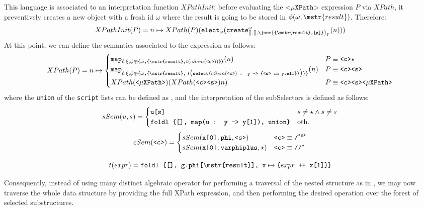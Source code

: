 \begin{definition}
This language is associated to an interpretation function $XPathInit$; before evaluating the $\texttt{<}\mu\texttt{XPath}\texttt{>}$  expression $P$ via $XPath$, it preventively creates a new object with a fresh id $\omega$ where the result is going to be stored in $\phi(\omega,\mstr{result})$. Therefore:
\[XPathInit(P) = n\mapsto XPath(P) (\texttt{elect}_\omega(\texttt{create}^\omega_{[],[],\jsem{\texttt{\{\mstr{result},[g]\}}}_\Gamma}(n)))\]
At this point, we can define the semantics associated to the expression as follows:
\[XPath(P) = n\mapsto \begin{cases}
	\texttt{map}_{\ell,\xi,\phi\oplus \texttt{\{}\omega\texttt{,\{\mstr{result},}t(cSem(\texttt{<c>}))\texttt{\}\}} }(n) & P\equiv \texttt{<c>}\star\\
	\texttt{map}_{\ell,\xi,\phi\oplus\texttt{\{}\omega\texttt{,\{\mstr{result},}\;t\big(\texttt{select(} cSem(\texttt{<c>}) \texttt{ : y -> \{<s> in y.\textbf{ell}\})}\big)\texttt{\}}\}}(n) & P\equiv \texttt{<c>}\texttt{<s>}\\
	XPath(\texttt{<}\mu\texttt{XPath>}) (XPath(\texttt{<c><s>}) n ) & P\equiv \texttt{<c><s>}\texttt{<}\mu\texttt{XPath>}\\
\end{cases}\]
where the \texttt{union} of the \texttt{script} lists can be defined as , and the interpretation of the subSelectors is defined as follows:
\[sSem(u,s)=\begin{cases}
\texttt{u[s]} & s\neq \star\wedge s\neq \varepsilon\\
\texttt{foldl \{[], map(u : y -> y[1]), union\}} & \textup{oth.}\\
\end{cases}\]
\[cSem(\texttt{<c>})=\begin{cases}
 sSem(\texttt{x[0].\textbf{phi}},\texttt{<s>})\texttt{} & \texttt{<c>}\equiv\texttt{/}^\texttt{\texttt{<s>}}\\
 sSem(\texttt{x[0].\textbf{varphiplus}},\star)\texttt{} & \texttt{<c>}\equiv\texttt{//}^{\star}\\
\end{cases}\]

\[t(expr)=\texttt{foldl \{[], g.\textbf{phi}[\mstr{result}], x}\mapsto\texttt{\{}expr\texttt{ ++ x[1]\}\}}\]
\end{definition}

Consequently, instead of using many distinct algebraic operator for performing a traversal of the nested structure as in \cite{Magnani06}, we may now traverse the whole data structure by providing the full XPath expression, and then performing the desired operation over the forest of selected substructures.

